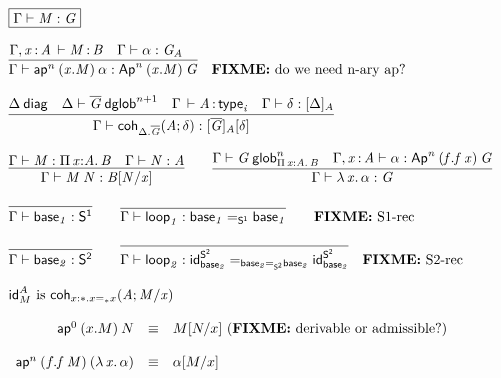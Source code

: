 \begin{small}
\[
\begin{array}{l}
\framebox{\ofglob{\Gamma}{M}{G}} \\ \\

\infer{\ofglob{\Gamma}{\apn{n}{(x.M)}{\alpha}}{\Apn{n}{(x.M)}{G}}}
      {\oftp{\Gamma,\tptm{x}{A}}{M}{B} &
       \ofglob{\Gamma}{\alpha}{G_A} &
      }
\quad
\text{\FIXME{do we need n-ary ap?}}
\\ \\

\infer{\ofglob{\Gamma}{\coh{\ctx{\Delta}.\diag{G}}{A}{\delta}}{\tsubst{\interpdiag{\diag{G}}{A}}{\delta}}}
      {\wfdiag{\Delta} &
       \wfdglob{\Delta}{\diag G}{n+1} &
       \oftp{\Gamma}{A}{\typ{i}} &
       \wfsub{\Gamma}{\delta}{\interpdiag{\Delta}{A}}
      }
\\ \\

\infer{\ofglob{\Gamma}{\app{M}{N}}{\subst{B}{N}{x}}}
      {\ofglob{\Gamma}{M}{\picl{x}{A}{B}} &
        \ofglob{\Gamma}{N}{A}}
\qquad
\infer{\ofglob{\Gamma}{\ulam{x}{\alpha}}{G}}
      {\wfglob{\Gamma}{G}{n}{\picl{x}{A}{B}} &
       \ofglob{\Gamma,\tptm{x}{A}}{\alpha}{\Apn{n}{(f.\app{f}{x})}{G}}}
\\ \\

\infer{\ofglob{\Gamma}{\base{1}}{\dsd{S^1}}}{}
\qquad
\infer{\ofglob{\Gamma}{\lp{1}}{\homj{\dsd{S^1}}{\base{1}}{\base{1}}}}
      {}
\qquad
\text{\FIXME{S1-rec}}
\\ \\
\infer{\ofglob{\Gamma}{\base{2}}{\dsd{S^2}}}{}
\qquad
\infer{\ofglob{\Gamma}{\lp{2}}{\homj{\homj{\dsd{S^2}}{\base{2}}{\base{2}}}{\idt{\dsd{S^2}}{\base{2}}}{\idt{\dsd{S^2}}{\base{2}}}}}
      {} 
\quad
\text{\FIXME{S2-rec}}
\\ \\
\text{\idt{A}{M} is \coh{x:\diagbase.\homj{\diagbase}{x}{x}}{A}{M/x}} 

\\ \\
\begin{array}{rcl}
\apn{0}{(x.M)}{N} & \equiv & \subst{M}{N}{x} \text{ (\FIXME{derivable or admissible?})} \\ \\

\apn{n}{(f.\app f M)}{(\ulam{x}{\alpha})} & \equiv & \tsubst{\alpha}{M/x} \\


\end{array}
\end{array}\]
\end{small}
